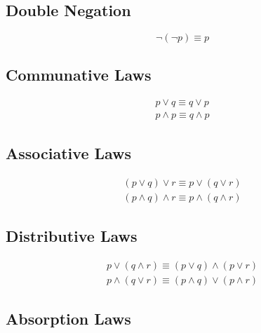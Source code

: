 \documentclass[12pt]{article}
\begin{document}
\subsection{Double Negation}

\begin{equation}
\neg (\neg p) \equiv p
\end{equation}

\subsection{Communative Laws}

\begin{subequations}\label{communative}
\begin{align}
p \lor q \equiv q \lor p\label{comm_first}\\
p \wedge p \equiv q \wedge p\label{comm_second}
\end{align}
\end{subequations}

\subsection{Associative Laws}

\begin{subequations}\label{associative}
\begin{align}
(p \lor q) \lor r \equiv p \lor (q \lor r)\label{ass_first}\\
(p \wedge q) \wedge r \equiv p \wedge (q \wedge r)\label{ass_second}
\end{align}
\end{subequations}

\subsection{Distributive Laws}

\begin{subequations}\label{distributive}
\begin{align}
p \lor (q \wedge r) \equiv (p \lor q) \wedge (p \lor r)\label{distr_first}\\
p \wedge (q \lor r) \equiv (p \wedge q) \lor (p \wedge r)\label{distr_second}
\end{align}
\end{subequations}

\subsection{Absorption Laws}
\end{document}
